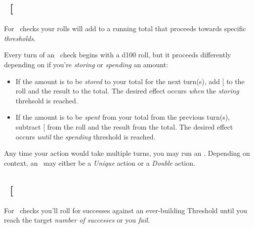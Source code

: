 \clearpage
\subsection{\ENDUful\ {[}\ENDU\index{\attribute!\ENDUful}{]}}\label{subsec:end}
\noindent For \ENDUful\ checks your rolls will add to a running total that proceeds towards specific \emph{thresholds}.

\noindent Every turn of an \ENDU\ check begins with a d100 roll, but it proceeds differently depending on if you're \emph{storing} or \emph{spending} an amount:
\begin{itemize}
	\item If the amount is to be \emph{stored} to your total for the next turn(s), add {[}\ENDU{]} to the roll and the result to the total. The desired effect occurs \emph{when} the \textit{storing} threhsold is reached.
	\item If the amount is to be \emph{spent} from your total from the previous turn(s), subtract {[}\ENDU{]} from the roll and the result from the total. The desired effect occurs \emph{until} the \textit{spending} threshold is reached.
\end{itemize}
\fillrlinemid
\noindent Any time your action would take multiple turns, you may run an \ENDU. Depending on context, an \ENDU\  may either be a \emph{Unique} action or a \emph{Double} action.


\noindent {}
\clearpage
\subsection{\SPEDful\ {[}\SPED\index{\attribute!\SPEDful}{]}}\label{subsec:spd}
\noindent For \SPEDful\ checks you'll roll for successes against an ever-building Threshold until you reach the target \textit{number of successes} or you \textit{fail}.

